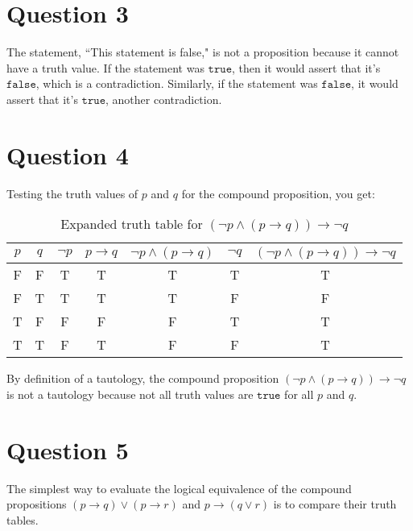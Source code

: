 \documentclass[letterpaper, 12pt]{article}
\begin{document}
\section*{Question 3}

The statement, ``This statement is false," is not a proposition because it cannot have a truth value. If the statement was $\texttt{true}$, then it would assert that it's $\texttt{false}$, which is a contradiction. Similarly, if the statement was $\texttt{false}$, it would assert that it's $\texttt{true}$, another contradiction.

\section*{Question 4}

Testing the truth values of $p$ and $q$ for the compound proposition, you get:

\begin{table}[H]
\centering
    \begin{tabular}{|c c|c|c|c|c|c|}
    \hline
    $p$ & $q$ & $\neg p$ & $p \to q$ & $\neg p \land (p \to q)$ & $\neg q$ & $(\neg p \land (p \to q)) \to \neg q$\\ \hline
    F & F & T & T & T & T & T\\ \hline
    F & T & T & T & T & F & F\\ \hline
    T & F & F & F & F & T & T\\ \hline
    T & T & F & T & F & F & T\\ \hline
    \end{tabular}
    \caption{Expanded truth table for $(\neg p \land (p \to q)) \to \neg q$}
    \label{table:2}
\end{table}

By definition of a tautology, the compound proposition $(\neg p \land (p \to q)) \to \neg q$ is not a tautology because not all truth values are $\texttt{true}$ for all $p$ and $q$.

\section*{Question 5}

The simplest way to evaluate the logical equivalence of the compound propositions $(p \to q) \lor (p \to r)$ and $p \to (q \lor r)$ is to compare their truth tables.

\begin{comment}
Combine the 2 following tables and highlight the columns with the compound propositions
\end{comment}
\end{document}
